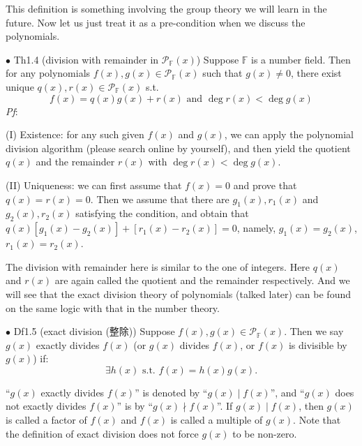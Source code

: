 \documentclass{article}
\begin{document}
\begin{Rmk}{}
    This definition is something involving the group theory we will learn in the future. Now let us just treat it as a pre-condition when we discuss the polynomials.
\end{Rmk}

\begin{Th}{$\bullet$ Th1.4 (division with remainder in $\mathcal{P}_\mathbb{F}(x)$)}
    Suppose $\mathbb{F}$ is a number field. Then for any polynomials $f(x), g(x)\in \mathcal{P}_\mathbb{F}(x)$ such that $g(x)\neq 0$, there exist unique $q(x), r(x)\in \mathcal{P}_\mathbb{F}(x)$ s.t. 
    $$f(x) = q(x)g(x)+r(x) \text{ and } \deg r(x)<\deg g(x)$$
    \tcblower
    \textit{Pf}: \begin{compactenum}
        \item[(I)] Existence: for any such given $f(x)$ and $g(x)$, we can apply the polynomial division algorithm (please search online by yourself), and then yield the quotient $q(x)$ and the remainder $r(x)$ with $\deg r(x)<\deg g(x)$.
        \item[(II)] Uniqueness: we can first assume that $f(x) = 0$ and prove that $q(x) = r(x) = 0$. Then we assume that there are $g_1(x), r_1(x)$ and $g_2(x), r_2(x)$ satisfying the condition, and obtain that $q(x)[g_1(x)-g_2(x)]+[r_1(x)-r_2(x)] = 0$, namely, $g_1(x) = g_2(x)$, $r_1(x) = r_2(x)$.
    \end{compactenum}
\end{Th}

\begin{Rmk}{}
    The division with remainder here is similar to the one of integers. \textcolor{Df}{Here $q(x)$ and $r(x)$ are again called the quotient and the remainder respectively.} And we will see that the exact division theory of polynomials (talked later) can be found on the same logic with that in the number theory.
\end{Rmk}

\begin{Df}{$\bullet$ Df1.5 (exact division (整除))}
    Suppose $f(x), g(x)\in \mathcal{P}_\mathbb{F}(x)$. Then we say $g(x)$ exactly divides $f(x)$ (or $g(x)$ divides $f(x)$, or $f(x)$ is divisible by $g(x)$) if:
    $$\exists h(x) \text{ s.t. } f(x) = h(x)g(x).$$
\end{Df}

\begin{Rmk}{}
    \textcolor{Df}{``$g(x)$ exactly divides $f(x)$'' is denoted by ``$g(x)\mid f(x)$'', and ``$g(x)$ does not exactly divides $f(x)$'' is by ``$g(x)\nmid f(x)$''. If $g(x)\mid f(x)$, then $g(x)$ is called a factor of $f(x)$ and $f(x)$ is called a multiple of $g(x)$.} Note that the definition of exact division does not force $g(x)$ to be non-zero.
\end{Rmk}
\end{document}
